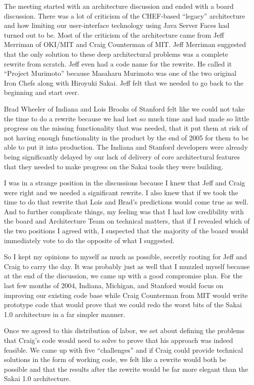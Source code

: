 \documentclass[12pt]{book}
\begin{document}
The meeting started with an architecture discussion and
ended with a board discussion.  There was a lot of criticism
of the CHEF-based ``legacy'' architecture and how limiting
our user-interface technology using Java Server Faces
had turned out to be.  Most of the criticism of
the architecture came from Jeff Merriman of OKI\slash MIT and
Craig Counterman of MIT.
Jeff Merriman suggested that the only solution to these
deep architectural problems was a complete rewrite
from scratch.  Jeff even had a code name for the rewrite.
He called it ``Project Murimoto'' because Masaharu Murimoto
was one of the two original Iron Chefs along with
Hiroyuki Sakai.  Jeff felt that we needed to go back to
the beginning and start over.

Brad Wheeler of Indiana and Lois
Brooks of Stanford felt like we could not take
the time to do a rewrite because we had lost
so much time and had made so little progress on the
missing functionality that was needed, that it
put them at risk of not having enough functionality
in the product by the end of 2005 for them
to be able to put it into production.  The
Indiana and Stanford developers were already
being significantly delayed by our lack of
delivery of core architectural features that they
needed to make progress on the Sakai tools they were
building.

I was in a strange position in the discussions
because I knew that Jeff and Craig were right
and we needed a significant rewrite.  I also knew that
if we took the time to do that rewrite that Lois and Brad's
predictions would come true as well.  And to further
complicate things, my feeling was that I had low credibility
with the board and Architecture Team on technical matters,
that if I revealed which of the two positions I
agreed with, I suspected that the majority of the board
would immediately vote to do the opposite of what I suggested.

So I kept my opinions to myself as much as possible,
secretly rooting for Jeff and Craig to carry the day.
It was probably just as well that I muzzled myself because
at the end of the discussion, we came up with a
good compromise plan.  For the last few months
of 2004, Indiana, Michigan, and Stanford would focus
on improving our existing code base while Craig
Counterman from MIT would write prototype code that would prove
that we could redo the worst bits of the Sakai 1.0
architecture in a far simpler manner.

Once we agreed to this distribution of labor, we set
about defining the problems that Craig's
code would need to solve to prove that his
approach was indeed feasible.  We came up with five
``challenges'' and if Craig could provide technical
solutions in the form of working code,
we felt like a rewrite would
both be possible and that the results after the
rewrite would be far more elegant than the Sakai 1.0
architecture.
\end{document}

